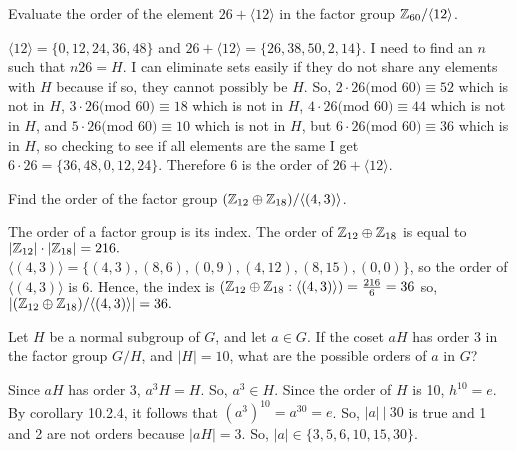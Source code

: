 \documentclass[titlepage]{article}
\begin{document}
\begin{problem}{10}
Evaluate the order of the element $26 + \langle 12 \rangle$ in the factor group $\mathbb{Z}_{60}/\langle 12 \rangle$.
\end{problem}
\begin{solution}
$\langle 12 \rangle = \{0,12,24,36,48\}$ and $26 + \langle 12 \rangle = \{26,38,50,2,14\}.$ I need to find an $n$ such that $n26 = H$. I can eliminate sets easily if they do not share any elements with $H$ because if so, they cannot possibly be $H$. So, $2\cdot26 \text{(mod 60)} \equiv 52$ which is not in $H$, $3 \cdot 26 \text{(mod 60)} \equiv 18$ which is not in $H$, $4 \cdot 26 \text{(mod 60)} \equiv 44$ which is not in $H$, and $5 \cdot 26 \text{(mod 60)} \equiv 10$ which is not in $H$, but $6 \cdot 26 \text{(mod 60)} \equiv 36$ which is in $H$, so checking to see if all elements are the same I get $6\cdot26 = \{36,48,0,12,24\}$. Therefore $6$ is the order of $26 + \langle 12 \rangle$. 
\end{solution}

\begin{problem}{11}
Find the order of the factor group $(\mathbb{Z}_{12} \oplus \mathbb{Z}_{18})/\langle(4,3)\rangle$.
\end{problem}
\begin{solution}
The order of a factor group is its index. The order of $\mathbb{Z}_{12}\oplus \mathbb{Z}_{18}$ is equal to $|\mathbb{Z}_{12}| \cdot |\mathbb{Z}_{18}| = 216.$ $\langle(4,3)\rangle = \{(4,3), (8,6), (0,9), (4,12), (8,15), (0,0)\}$, so the order of $\langle (4,3) \rangle$ is 6. Hence, the index is $(\mathbb{Z}_{12}\oplus \mathbb{Z}_{18} : \langle (4,3) \rangle) = \frac{216}{6} = 36$ so, $|(\mathbb{Z}_{12}\oplus \mathbb{Z}_{18})/\langle(4,3)\rangle| = 36.$
\end{solution}

\begin{problem}{12}
Let $H$ be a normal subgroup of $G$, and let $a \in G$. If the coset $aH$ has order 3 in the factor group $G/H$, and $|H| = 10$, what are the possible orders of $a$ in $G$?
\end{problem}
\begin{solution}
Since $aH$ has order 3, $a^3H = H$. So, $a^3 \in H$. Since the order of $H$ is 10, $h^{10} = e$. By corollary 10.2.4, it follows that $(a^3)^{10} = a^{30} = e$. So, $|a| \ | \ 30$ is true and 1 and 2 are not orders because $|aH|=3$. So, $|a| \in \{3,5,6,10,15,30\}$.
\end{solution}
\end{document}

